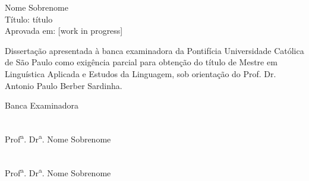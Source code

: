 \begin{titlepage}
\begin{center}
    \end{center}
\end{titlepage}

\begin{titlepage}
    Nome Sobrenome\\
    Título: título\\
    Aprovada em: [work in progress]

    \vspace{2cm}
    Dissertação apresentada à banca examinadora da Pontifícia Universidade Católica de São Paulo como exigência parcial para obtenção do título de Mestre em Linguística Aplicada e Estudos da Linguagem, sob orientação do Prof. Dr. Antonio Paulo Berber Sardinha.

    \vspace{4cm}
    Banca Examinadora

    \vspace{3cm}
    \makebox[0.75\textwidth]{\hrulefill}\\
    Prof\textsuperscript{a}. Dr\textsuperscript{a}. Nome Sobrenome

    \vspace{3cm}
    \makebox[0.75\textwidth]{\hrulefill}\\
    Prof\textsuperscript{a}. Dr\textsuperscript{a}. Nome Sobrenome

\end{titlepage}

